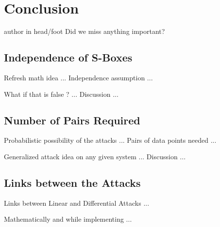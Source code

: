 \documentclass[9pt]{beamer}
\begin{document}
\section{Conclusion}
\begin{frame}
\begin{beamercolorbox}[ht=2.5ex,dp=1.125ex,center,rounded=true,shadow=true]{author in head/foot}
Did we miss anything important?
\end{beamercolorbox}
\end{frame}

\subsection{Independence of S-Boxes}
\begin{frame}
Refresh math idea ... Independence assumption ...

\end{frame}

\begin{frame}
What if that is false ? ... Discussion ...

\end{frame}

\subsection{Number of Pairs Required}
\begin{frame}
Probabilistic possibility of the attacks ... Pairs of data points needed ...

\end{frame}

\begin{frame}
Generalized attack idea on any given system ... Discussion ...

\end{frame}

\subsection{Links between the Attacks}
\begin{frame}
Links between Linear and Differential Attacks ...

\end{frame}

\begin{frame}
Mathematically and while implementing ...

\end{frame}
\end{document}
